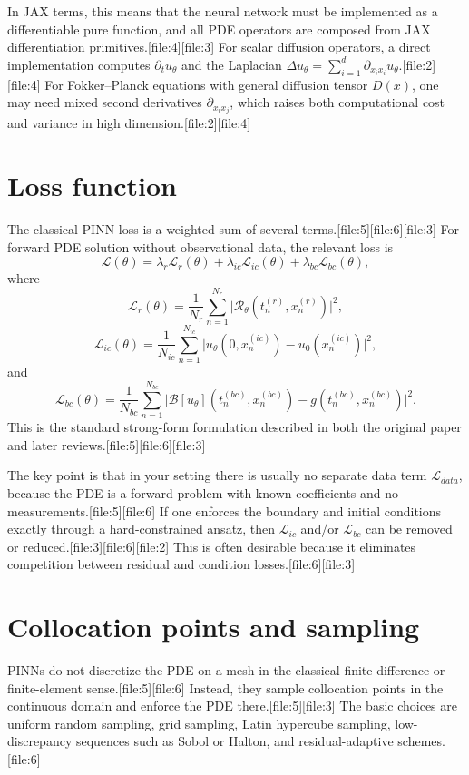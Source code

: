\documentclass[11pt]{report}
\begin{document}
In JAX terms, this means that the neural network must be implemented as a differentiable pure function, and all PDE operators are composed from JAX differentiation primitives.[file:4][file:3]  
For scalar diffusion operators, a direct implementation computes \(\partial_t u_\theta\) and the Laplacian \(\Delta u_\theta = \sum_{i=1}^d \partial_{x_i x_i}u_\theta\).[file:2][file:4]  
For Fokker--Planck equations with general diffusion tensor \(D(x)\), one may need mixed second derivatives \(\partial_{x_i x_j}\), which raises both computational cost and variance in high dimension.[file:2][file:4]

\section{Loss function}

The classical PINN loss is a weighted sum of several terms.[file:5][file:6][file:3]  
For forward PDE solution without observational data, the relevant loss is
\[
\mathcal{L}(\theta)
=
\lambda_r \mathcal{L}_r(\theta)
+
\lambda_{ic} \mathcal{L}_{ic}(\theta)
+
\lambda_{bc} \mathcal{L}_{bc}(\theta),
\]
where
\[
\mathcal{L}_r(\theta)
=
\frac{1}{N_r}\sum_{n=1}^{N_r}
\bigl|\mathcal{R}_\theta(t_n^{(r)},x_n^{(r)})\bigr|^2,
\]
\[
\mathcal{L}_{ic}(\theta)
=
\frac{1}{N_{ic}}\sum_{n=1}^{N_{ic}}
\bigl|u_\theta(0,x_n^{(ic)})-u_0(x_n^{(ic)})\bigr|^2,
\]
and
\[
\mathcal{L}_{bc}(\theta)
=
\frac{1}{N_{bc}}\sum_{n=1}^{N_{bc}}
\bigl|\mathcal{B}[u_\theta](t_n^{(bc)},x_n^{(bc)})-g(t_n^{(bc)},x_n^{(bc)})\bigr|^2.
\]
This is the standard strong-form formulation described in both the original paper and later reviews.[file:5][file:6][file:3]

The key point is that in your setting there is usually no separate data term \(\mathcal{L}_{data}\), because the PDE is a forward problem with known coefficients and no measurements.[file:5][file:6]  
If one enforces the boundary and initial conditions exactly through a hard-constrained ansatz, then \(\mathcal{L}_{ic}\) and/or \(\mathcal{L}_{bc}\) can be removed or reduced.[file:3][file:6][file:2]  
This is often desirable because it eliminates competition between residual and condition losses.[file:6][file:3]

\section{Collocation points and sampling}

PINNs do not discretize the PDE on a mesh in the classical finite-difference or finite-element sense.[file:5][file:6]  
Instead, they sample collocation points in the continuous domain and enforce the PDE there.[file:5][file:3]  
The basic choices are uniform random sampling, grid sampling, Latin hypercube sampling, low-discrepancy sequences such as Sobol or Halton, and residual-adaptive schemes.[file:6]
\end{document}
